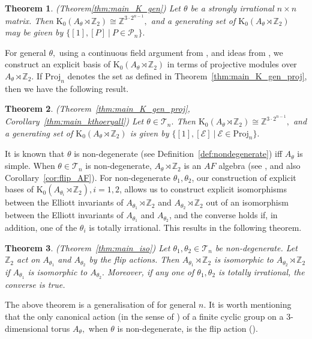 \documentclass[9pt, BCOR=2mm]{amsart}
\numberwithin{equation}{section}
\numberwithin{equation}{section}
\newtheorem{theorem}{Theorem}[section]
\newcommand{\Z}{{\mathbb{Z}}}
\newcommand{\K}{\mathrm{K}} %
\begin{document}
\begin{theorem}(Theorem\label{intro:thm1}\ref{thm:main_K_gen})
  Let $\theta$ be a strongly irrational $n\times n$ matrix. Then
  $\K_0(A_{\theta}\rtimes \Z_2)\cong \Z^{3\cdot 2^{n-1}},$ and a generating set  of $\K_0(A_{\theta}\rtimes \Z_2)$ may be  given by 
 $\{[1], [P] ~|~ P\in \mathcal{P}_n\}.$ 
  	\end{theorem}



   For general $\theta,$  using a continuous field argument from \cite{ELPW10}, and ideas from \cite{Cha20}, we construct an explicit basis of $\K_0(A_\theta \rtimes \Z_2)$ in terms of projective modules over $A_\theta \rtimes \Z_2.$ If $\mathrm{Proj}_n$ denotes the set as defined in Theorem~\ref{thm:main_K_gen_proj}, then we have the following result. 
 
   \begin{theorem}\label{intro:thm2}(Theorem~\ref{thm:main_K_gen_proj}, Corollary~\ref{thm:main_kthoeryall}) Let $\theta \in \mathcal{T}_n.$ Then $\K_0(A_{\theta}\rtimes \Z_2)\cong \Z^{3\cdot 2^{n-1}},$ and a generating set  of $\K_0(A_{\theta}\rtimes \Z_2)$ is   given by 
 $\{[1], [\mathcal{E}] ~|~ \mathcal{E}\in \mathrm{Proj}_n\}.$ 
	 \end{theorem}
  
  
  
 It is known that $\theta$ is non-degenerate (see Definition~\ref{def:nondegenerate}) iff $A_\theta$ is simple. When $\theta \in \mathcal{T}_{n}$ is non-degenerate,  $A_\theta\rtimes \Z_2$ is an $A F$ algebra (see \cite[Theorem 6.6]{ELPW10}, and also Corollary~\ref{cor:flip_AF}). For non-degenerate $\theta_1, \theta_2$, our construction of explicit bases of $\K_0\left(A_{\theta_i} \rtimes \mathbb{Z}_2\right), i=1,2$, allows us to construct explicit isomorphisms between the Elliott invariants of $A_{\theta_1} \rtimes \mathbb{Z}_2$ and $A_{\theta_2} \rtimes \mathbb{Z}_2$ out of an isomorphism between the Elliott invariants of $A_{\theta_1}$ and $A_{\theta_2}$, and the converse holds if, in addition, one of the $\theta_i$ is totally irrational. This results in the following theorem.

\begin{theorem}
	\label{intro:thm3}(Theorem~\ref{thm:main_iso})
		Let $\theta_{1}, \theta_{2} \in \mathcal{T}_n $ be non-degenerate.
		Let $\Z_2$ act on $A_{\theta_{1}}$ and $A_{\theta_{2}}$ by the flip actions.  Then $A_{\theta_{1}}\rtimes \Z_2$ is isomorphic to $A_{\theta_{2}}\rtimes \Z_2$ if $A_{\theta_{1}}$ is isomorphic to $A_{\theta_{2}}.$ Moreover, if any one of $\theta_{1}, \theta_{2}$ is totally irrational, the converse is true.
 	 \end{theorem}
 	 The above theorem is a generalisation of \cite[Theorem 6.4]{ELPW10} for general $n.$ It is worth mentioning that the only canonical action (in the sense of \cite{JL15}) of a finite cyclic group on a 3-dimensional torus $A_\theta,$ when $\theta$ is non-degenerate, is the flip action (\cite[Theorem 1.4]{JL15}).  
\end{document}
